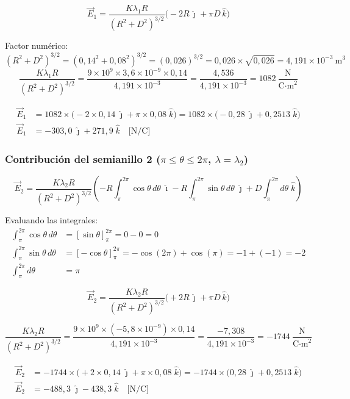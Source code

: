 \documentclass[12pt,letterpaper]{article}
\begin{document}
\[
    \vec{E}_1 = \frac{K\lambda_1 R}{(R^2+D^2)^{3/2}}\bigl(-2R\,\hat{\jmath} + \pi D\,\hat{k}\bigr)
\]

Factor numérico:
\[
    (R^2+D^2)^{3/2} = (0{,}14^2+0{,}08^2)^{3/2} = (0{,}026)^{3/2}
    = 0{,}026\times\sqrt{0{,}026} = 4{,}191\times10^{-3}\ \text{m}^3
\]
\[
    \frac{K\lambda_1 R}{(R^2+D^2)^{3/2}}
    = \frac{9\times10^9\times3{,}6\times10^{-9}\times0{,}14}{4{,}191\times10^{-3}}
    = \frac{4{,}536}{4{,}191\times10^{-3}} = 1082\ \frac{\text{N}}{\text{C·m}^2}
\]

\begin{align*}
    \vec{E}_1 &= 1082\times\bigl(-2\times0{,}14\;\hat{\jmath} + \pi\times0{,}08\;\hat{k}\bigr)
               = 1082\times\bigl(-0{,}28\;\hat{\jmath} + 0{,}2513\;\hat{k}\bigr)\\
    \vec{E}_1 &= -303{,}0\;\hat{\jmath} + 271{,}9\;\hat{k} \quad\text{[N/C]}
\end{align*}

\subsubsection*{Contribución del semianillo 2 ($\pi\leq\theta\leq2\pi$, $\lambda=\lambda_2$)}

\[
    \vec{E}_2 = \frac{K\lambda_2 R}{(R^2+D^2)^{3/2}}
    \left(-R\!\int_\pi^{2\pi}\!\cos\theta\,d\theta\;\hat{\imath}
          -R\!\int_\pi^{2\pi}\!\sin\theta\,d\theta\;\hat{\jmath}
          +D\!\int_\pi^{2\pi}\!d\theta\;\hat{k}\right)
\]

Evaluando las integrales:
\begin{align*}
    \int_\pi^{2\pi}\cos\theta\,d\theta &= [\sin\theta]_\pi^{2\pi} = 0 - 0 = 0\\
    \int_\pi^{2\pi}\sin\theta\,d\theta &= [-\cos\theta]_\pi^{2\pi}
        = -\cos(2\pi)+\cos(\pi) = -1+(-1) = -2\\
    \int_\pi^{2\pi}d\theta &= \pi
\end{align*}

\[
    \vec{E}_2 = \frac{K\lambda_2 R}{(R^2+D^2)^{3/2}}\bigl(+2R\,\hat{\jmath} + \pi D\,\hat{k}\bigr)
\]

\[
    \frac{K\lambda_2 R}{(R^2+D^2)^{3/2}}
    = \frac{9\times10^9\times(-5{,}8\times10^{-9})\times0{,}14}{4{,}191\times10^{-3}}
    = \frac{-7{,}308}{4{,}191\times10^{-3}} = -1744\ \frac{\text{N}}{\text{C·m}^2}
\]

\begin{align*}
    \vec{E}_2 &= -1744\times\bigl(+2\times0{,}14\;\hat{\jmath} + \pi\times0{,}08\;\hat{k}\bigr)
               = -1744\times\bigl(0{,}28\;\hat{\jmath} + 0{,}2513\;\hat{k}\bigr)\\
    \vec{E}_2 &= -488{,}3\;\hat{\jmath} - 438{,}3\;\hat{k} \quad\text{[N/C]}
\end{align*}
\end{document}
